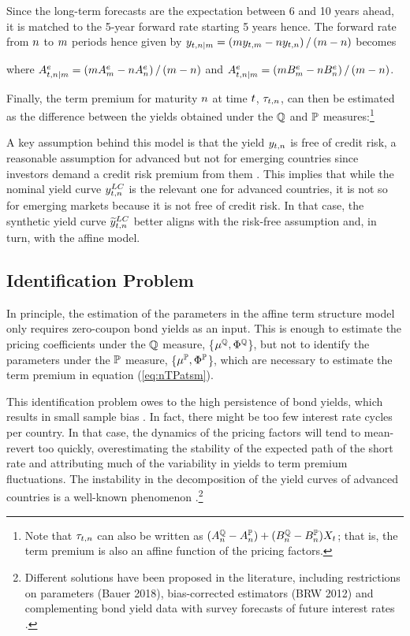 {Since the long-term forecasts are the expectation between 6 and 10 years ahead, it is matched to the 5-year forward rate starting 5 years hence. The forward rate from \(n\) to \(m\) periods hence
given by \(y_{t,n | m} = \left( m y_{t,m} - n y_{t,n} \right)/ \left( m - n \right)\) becomes
	
\noindent where \(A_{t,n | m}^{e} = \left( m A_{m}^{e} - n A_{n}^{e} \right)/ \left( m - n \right)\)  and \(A_{t,n | m}^{e} = \left( m B_{m}^{e} - n B_{n}^{e} \right)/ \left( m - n \right)\).

Finally, the term premium for maturity \(n\) at time \(t\), \(\tau_{t,n}\), can then be estimated as the difference between the yields obtained under the \(\mathbb{Q}\) and \(\mathbb{P}\) measures:\footnote{ Note that \(\tau_{t,n}\) can also be written as \( (A_{n}^{\mathbb{Q}} - A_{n}^{\mathbb{P}}) + (B_{n}^{\mathbb{Q}}  - B_{n}^{\mathbb{P}}) X_{t} \); that is, the term premium is also an affine function of the pricing factors.}
	
A key assumption behind this model is that the yield \(y_{t,n}\) is free of credit risk, a reasonable assumption for advanced but not for emerging countries since investors demand a credit risk premium from them \citep{DuSchreger:2016JoF}. 
This implies that while the nominal yield curve \(y_{t,n} ^{LC}\) is the relevant one for advanced countries, it is not so for emerging markets because it is not free of credit risk.
In that case, the synthetic yield curve \(\widetilde{y}_{t,n} ^{LC}\) better aligns with the risk-free assumption and, in turn, with the affine model.

\subsection{Identification Problem} \label{sec:Identification}
\iftoggle{toclinks}{\gototoc}{} %

In principle, the estimation of the parameters in the affine term structure model only  requires zero-coupon bond yields as an input.
This is enough to estimate the pricing coefficients under the \(\mathbb{Q}\) measure,
\{\(\mu^{\mathbb{Q}}, \Phi^{\mathbb{Q}}\)\}, but not to identify the parameters under the \(\mathbb{P}\) measure, 
\{\(\mu^{\mathbb{P}}, \Phi^{\mathbb{P}}\)\}, which are necessary to estimate the term premium in equation (\ref{eq:nTPatsm}).

This identification problem owes to the high persistence of bond yields, which results in small sample bias \citep{KimOrphanides:2012}. 
In fact, there might be too few interest rate cycles per country.
In that case, the dynamics of the pricing factors will tend to mean-revert too quickly, overestimating the stability of the expected path of the short rate and attributing much of the variability in yields to term premium fluctuations.
The instability in the decomposition of the yield curves of advanced countries is a well-known phenomenon \citep{Cochrane:2007}.\footnote{ Different solutions have been proposed in the literature, including restrictions on parameters \citep{Duffee:2010} (Bauer 2018), bias-corrected estimators (BRW 2012) and complementing bond yield data with survey forecasts of future interest rates \citep{KimWright:2005,KimOrphanides:2012}.}

}
